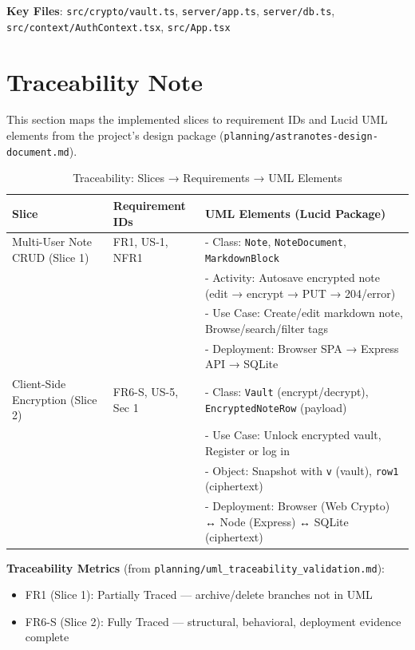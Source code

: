\documentclass[11pt,a4paper]{article}
\begin{document}
\textbf{Key Files}:
\texttt{src/crypto/vault.ts}, \texttt{server/app.ts}, \texttt{server/db.ts}, \texttt{src/context/AuthContext.tsx}, \texttt{src/App.tsx}

\section{Traceability Note}
This section maps the implemented slices to requirement IDs and Lucid UML elements from the project's design package (\texttt{planning/astranotes-design-document.md}).

\begin{table}[h]
\centering
\renewcommand{\arraystretch}{1.5}
\begin{tabular}{|p{3cm}|p{4cm}|p{6cm}|}
\hline
\textbf{Slice} & \textbf{Requirement IDs} & \textbf{UML Elements (Lucid Package)} \\
\hline
Multi-User Note CRUD (Slice 1) & FR1, US-1, NFR1 & 
  - Class: \texttt{Note}, \texttt{NoteDocument}, \texttt{MarkdownBlock} \\
  & & - Activity: Autosave encrypted note (edit → encrypt → PUT → 204/error) \\
  & & - Use Case: Create/edit markdown note, Browse/search/filter tags \\
  & & - Deployment: Browser SPA → Express API → SQLite \\
\hline
Client-Side Encryption (Slice 2) & FR6-S, US-5, Sec 1 & 
  - Class: \texttt{Vault} (encrypt/decrypt), \texttt{EncryptedNoteRow} (payload) \\
  & & - Use Case: Unlock encrypted vault, Register or log in \\
  & & - Object: Snapshot with \texttt{v} (vault), \texttt{row1} (ciphertext) \\
  & & - Deployment: Browser (Web Crypto) ↔ Node (Express) ↔ SQLite (ciphertext) \\
\hline
\end{tabular}
\caption{Traceability: Slices → Requirements → UML Elements}
\end{table}

\textbf{Traceability Metrics} (from \texttt{planning/uml\_traceability\_validation.md}):
\begin{itemize}
  \item FR1 (Slice 1): Partially Traced — archive/delete branches not in UML
  \item FR6-S (Slice 2): Fully Traced — structural, behavioral, deployment evidence complete
\end{itemize}
\end{document}
